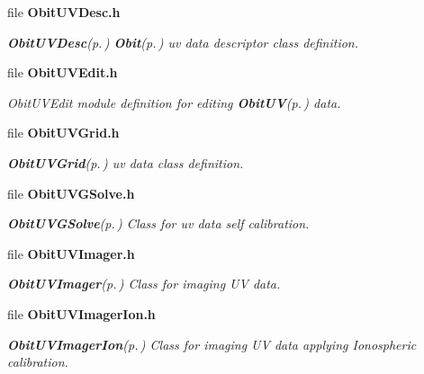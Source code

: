 \begin{CompactItemize}
\item 
file {\bf Obit\-UVDesc.h}
\begin{CompactList}\small\item\em {\bf Obit\-UVDesc}{\rm (p.\,\pageref{structObitUVDesc})} {\bf Obit}{\rm (p.\,\pageref{structObit})} uv data descriptor class definition. \item\end{CompactList}

\item 
file {\bf Obit\-UVEdit.h}
\begin{CompactList}\small\item\em Obit\-UVEdit module definition for editing {\bf Obit\-UV}{\rm (p.\,\pageref{structObitUV})} data. \item\end{CompactList}

\item 
file {\bf Obit\-UVGrid.h}
\begin{CompactList}\small\item\em {\bf Obit\-UVGrid}{\rm (p.\,\pageref{structObitUVGrid})} uv data class definition. \item\end{CompactList}

\item 
file {\bf Obit\-UVGSolve.h}
\begin{CompactList}\small\item\em {\bf Obit\-UVGSolve}{\rm (p.\,\pageref{structObitUVGSolve})} Class for uv data self calibration. \item\end{CompactList}

\item 
file {\bf Obit\-UVImager.h}
\begin{CompactList}\small\item\em {\bf Obit\-UVImager}{\rm (p.\,\pageref{structObitUVImager})} Class for imaging UV data. \item\end{CompactList}

\item 
file {\bf Obit\-UVImager\-Ion.h}
\begin{CompactList}\small\item\em {\bf Obit\-UVImager\-Ion}{\rm (p.\,\pageref{structObitUVImagerIon})} Class for imaging UV data applying Ionospheric calibration. \item\end{CompactList}


\end{CompactItemize}
